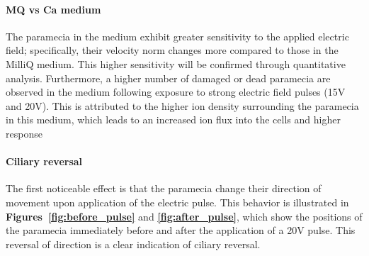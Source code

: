 \paragraph{MQ vs Ca medium}
The paramecia in the  medium exhibit greater sensitivity to the applied electric field; specifically, their velocity norm changes more compared to those  in the MilliQ medium. This higher sensitivity will be confirmed through quantitative analysis. Furthermore, a higher number of damaged or dead paramecia are observed in the  medium following exposure to strong electric field pulses (15V and 20V). This is attributed to the higher ion density surrounding the paramecia in this medium, which leads to an increased ion flux into the cells and higher response

\paragraph{Ciliary reversal}
The first noticeable effect is that the paramecia change their direction of movement upon application of the electric pulse. This behavior is illustrated in \textbf{Figures~\ref{fig:before_pulse}} and \textbf{\ref{fig:after_pulse}}, which show the positions of the paramecia immediately before and after the application of a 20V pulse. This reversal of direction is a clear indication of ciliary reversal.

